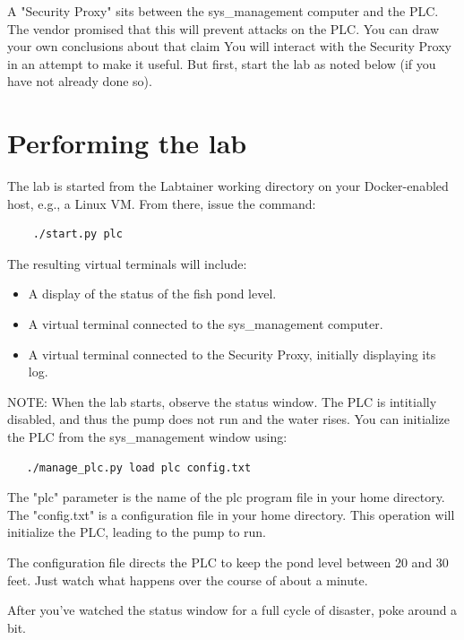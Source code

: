 \documentclass{article}
\begin{document}
A "Security Proxy" sits between the sys\_management computer and the PLC.  The vendor promised
that this will prevent attacks on the PLC.  You can draw your own conclusions about that claim
You will interact with the Security Proxy in an attempt to make it useful.  But first, start the lab
as noted below (if you have not already done so).

\section {Performing the lab}
The lab is started from the Labtainer working
directory on your Docker-enabled host, e.g., a Linux VM.
From there, issue the command:
\begin{verbatim}
    ./start.py plc
\end{verbatim}
\noindent The resulting virtual terminals will include: 
\begin{itemize}
\item A display of the status of the fish pond level.
\item A virtual terminal connected to the sys\_management computer.
\item A virtual terminal connected to the Security Proxy, initially displaying its log.
\end{itemize}
NOTE: When the lab starts, observe the status window. The PLC is intitially
disabled, and thus the pump does not run and the water rises.  
You can initialize the PLC from the sys\_management window using:
\begin{verbatim}
   ./manage_plc.py load plc config.txt
\end{verbatim}

\noindent The "plc" parameter is the name of the plc program file in your home directory.
The "config.txt" is a configuration file in your home directory.  This operation
will initialize the PLC, leading to the pump to run.

The configuration file directs the PLC to keep the pond level between 20 and 30 feet.
Just watch what happens over the course of about a minute.

After you've watched the status window for a full cycle of disaster, 
poke around a bit.  

\renewcommand\thesubsubsection{}
\end{document}
